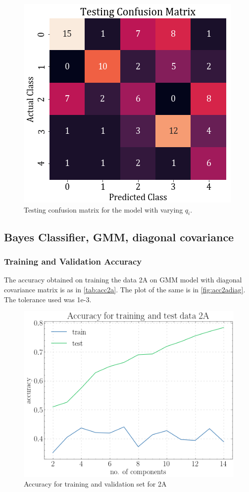 \documentclass[11pt,a4paper]{article}
\begin{document}
\begin{figure}[H]
    \centering
    \includegraphics[scale=0.5]{images/2A/2a_full_cross_test.png}
    \caption{Testing confusion matrix for the model with varying $q_i$.}
\end{figure}


\subsection{Bayes Classifier, GMM, diagonal covariance}
\subsubsection{Training and Validation Accuracy}
The accuracy obtained on training the data 2A on GMM model with diagonal covariance matrix is as in \autoref{tab:acc2a}. The plot of the same is in \autoref{fig:acc2adiag}. The tolerance used was 1e-3.


\begin{figure}[H]
    \centering
    \includegraphics[scale=0.5]{images/acc_2a.png}
    \caption{Accuracy for training and validation set for 2A}
    \label{fig:acc2adiag}
\end{figure}
\end{document}
